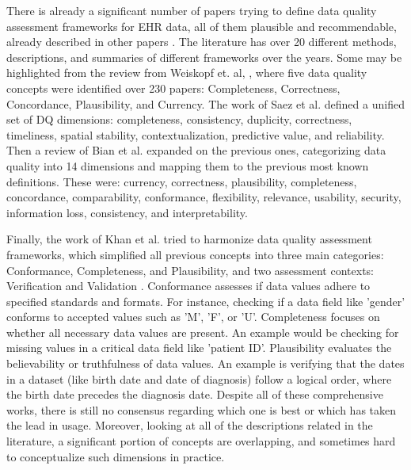 There is already a significant number of papers trying to define data quality assessment frameworks for EHR data, all of them plausible and recommendable, already described in other papers \cite{bianAssessingPracticeData2020}. The literature has over 20 different methods, descriptions, and summaries of different frameworks over the years. Some may be highlighted from the review from Weiskopf et. al, \cite{weiskopfMethodsDimensionsElectronic2013}, where five data quality concepts were identified over 230 papers: Completeness, Correctness, Concordance, Plausibility, and Currency. 
The work of Saez et al. defined a unified set of DQ dimensions: completeness, consistency, duplicity, correctness, timeliness, spatial stability, contextualization, predictive value, and reliability\cite{saezOrganizingDataQuality}. Then a review of Bian et al. \cite{bianAssessingPracticeData2020} expanded on the previous ones, categorizing data quality into 14 dimensions and mapping them to the previous most known definitions. These were: currency, correctness, plausibility, completeness, concordance, comparability, conformance, flexibility, relevance, usability, security, information loss, consistency, and interpretability.

Finally, the work of Khan et al. tried to harmonize data quality assessment frameworks, which simplified all previous concepts into three main categories: Conformance, Completeness, and Plausibility, and two assessment contexts: Verification and Validation \cite{kahnHarmonizedDataQuality2016a}. Conformance  assesses if data values adhere to specified standards and formats. For instance, checking if a data field like 'gender' conforms to accepted values such as 'M', 'F', or 'U'. Completeness focuses on whether all necessary data values are present. An example would be checking for missing values in a critical data field like 'patient ID'. Plausibility evaluates the believability or truthfulness of data values. An example is verifying that the dates in a dataset (like birth date and date of diagnosis) follow a logical order, where the birth date precedes the diagnosis date. Despite all of these comprehensive works, there is still no consensus regarding which one is best or which has taken the lead in usage. Moreover, looking at all of the descriptions related in the literature, a significant portion of concepts are overlapping, and sometimes hard to conceptualize such dimensions in practice.


